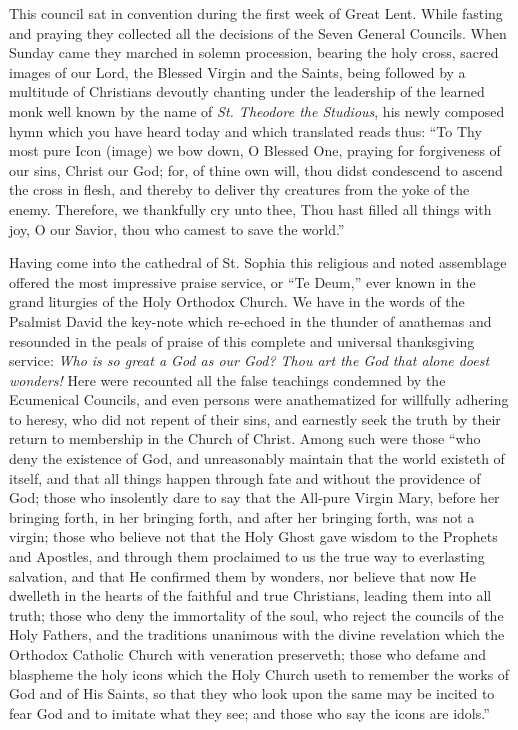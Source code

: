 This council sat in convention during the first 
week of Great Lent. While fasting and praying
they collected all the decisions of the Seven 
General Councils. When Sunday came they 
marched in solemn procession, bearing the holy 
cross, sacred images of our Lord, the Blessed 
Virgin and the Saints, being followed by a multitude
of Christians devoutly chanting under 
the leadership of the learned monk well known 
by the name of \textit{St. Theodore the Studious}, his 
newly composed hymn which you have heard 
today and which translated reads thus: ``To 
Thy most pure Icon (image) we bow down, 
O Blessed One, praying for forgiveness of our 
sins, Christ our God; for, of thine own will, 
thou didst condescend to ascend the cross in
flesh, and thereby to deliver thy creatures from 
the yoke of the enemy. Therefore, we thankfully
cry unto thee, Thou hast filled all things 
with joy, O our Savior, thou who camest to 
save the world.'' 

Having come into the cathedral of St. Sophia 
this religious and noted assemblage offered the 
most impressive praise service, or ``Te Deum,'' 
ever known in the grand liturgies of the Holy 
Orthodox Church. We have in the words of 
the Psalmist David the key-note which re-echoed 
in the thunder of anathemas and resounded in 
the peals of praise of this complete and universal
thanksgiving service: \textit{Who is so great a 
God as our God? Thou art the God that alone 
doest wonders!} Here were recounted all the 
false teachings condemned by the Ecumenical 
Councils, and even persons were anathematized 
for willfully adhering to heresy, who did not 
repent of their sins, and earnestly seek the truth 
by their return to membership in the Church of 
Christ. Among such were those ``who deny 
the existence of God, and unreasonably maintain
that the world existeth of itself, and that 
all things happen through fate and without the 
providence of God; those who insolently dare 
to say that the All-pure Virgin Mary, before her 
bringing forth, in her bringing forth, and after
her bringing forth, was not a virgin; those who 
believe not that the Holy Ghost gave wisdom 
to the Prophets and Apostles, and through them 
proclaimed to us the true way to everlasting 
salvation, and that He confirmed them by wonders,
nor believe that now He dwelleth in the 
hearts of the faithful and true Christians, leading
them into all truth; those who deny the 
immortality of the soul, who reject the councils 
of the Holy Fathers, and the traditions unanimous
with the divine revelation which the Orthodox
Catholic Church with veneration preserveth;
those who defame and blaspheme the holy 
icons which the Holy Church useth to remember
the works of God and of His Saints, so that 
they who look upon the same may be incited to 
fear God and to imitate what they see; and 
those who say the icons are idols.'' 


